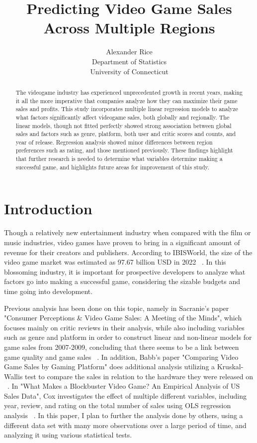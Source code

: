 \documentclass[12pt]{article}
\title{Predicting Video Game Sales Across Multiple Regions}
\author{Alexander Rice\\
  Department of Statistics\\
  University of Connecticut
}
\begin{document}
\maketitle

\begin{abstract}
The videogame industry has experienced unprecedented growth in recent years, making it all the more imperative that companies analyze how they can maximize their game sales and profits.
This study incorporates multiple linear regression models to analyze what factors significantly affect videogame sales, both globally and regionally.
The linear models, though not fitted perfectly showed strong association between global sales and factors such as genre, platform, both user and critic scores and counts, and year of release.
Regression analysis showed minor differences between region preferences such as rating, and those mentioned previously. 
These findings highlight that further research is needed to determine what variables determine making a successful game, and highlights future areas for improvement of this study.

\end{abstract}


\section{Introduction}
\label{sec:intro}
Though a relatively new entertainment industry when compared with the film or music industries, video games have proven to bring in a 
significant amount of revenue for their creators and publishers. According to IBISWorld, the size of the video game market was estimated 
as 97.67 billion USD in 2022 ~\citep[(A)][]{Marketsizestat}.  In this blossoming industry, it is important for prospective developers 
to analyze what factors go into making a successful game, considering the sizable budgets and time going into development. 

Previous analysis has been done on this topic, namely in Sacranie's paper "Consumer Perceptions \& Video Game Sales: A Meeting of the Minds", 
which focuses mainly on critic reviews in their analysis, while also including variables such as genre and platform in order to construct 
linear and non-linear models for game sales from 2007-2009, concluding that there seems to be a link between game quality and game sales 
~\citep[(B)][]{Sacranie2010Analysis}. In addition, Babb's paper "Comparing Video Game Sales by Gaming Platform" does additional analysis 
utilizing a Kruskal-Wallis test to compare the sales in relation to the hardware they were released on ~\citep[(C)][]{Babb2013Analysis}. 
In "What Makes a Blockbuster Video Game? An Empirical Analysis of US Sales Data", Cox investigates the effect of multiple different variables,
including year, review, and rating on the total number of sales using OLS regression analysis ~\citep[(E)][]{Cox2013Analysis}.
In this paper, I plan to further the analysis done by others, using a different data set with many more observations over a large period 
of time, and analyzing it using various statistical tests.
\end{document}
